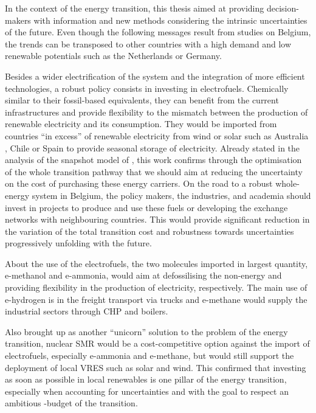 In the context of the energy transition, this thesis aimed at providing decision-makers with information and new methods considering the intrinsic uncertainties of the future. Even though the following messages result from studies on Belgium, the trends can be transposed to other countries with a high demand and low renewable potentials such as the Netherlands or Germany. 

Besides a wider electrification of the system and the integration of more efficient technologies, a robust policy consists in investing in electrofuels. Chemically similar to their fossil-based equivalents, they can benefit from the current infrastructures and provide flexibility to the mismatch between the production of renewable electricity and its consumption. They would be imported from countries ``in excess'' of renewable electricity from wind or solar such as Australia \cite{Australia_efuels}, Chile \cite{Chile_efuels} or Spain \cite{Spain_efuels} to provide seasonal storage of electricity. Already stated in the analysis of the snapshot model of \citet{rixhon2021role}, this work confirms through the optimisation of the whole transition pathway that we should aim at reducing the uncertainty on the cost of purchasing these energy carriers. On the road to a robust whole-energy system in Belgium, the policy makers, the industries, and academia should invest in projects to produce and use these fuels or developing the exchange networks with neighbouring countries. This would provide significant reduction in the variation of the total transition cost and robustness towards uncertainties progressively unfolding with the future. 

About the use of the electrofuels, the two molecules imported in largest quantity, e-methanol and e-ammonia, would aim at defossilising the non-energy and providing flexibility in the production of electricity, respectively. The main use of e-hydrogen is in the freight transport via trucks and e-methane would supply the industrial sectors through \gls{CHP} and boilers.

Also brought up as another ``unicorn'' solution to the problem of the energy transition, nuclear \gls{SMR} would be a cost-competitive option against the import of electrofuels, especially e-ammonia and e-methane, but would still support the deployment of local \acrfull{VRES} such as solar and wind. This confirmed that investing as soon as possible in local renewables is one pillar of the energy transition, especially when accounting for uncertainties and with the goal to respect an ambitious -budget of the transition. 

